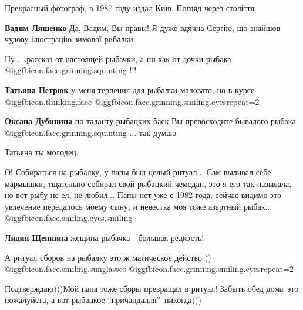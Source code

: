  
 
 
 
 
\zzSecCmt

\begin{itemize} %
Прекрасный фотограф, в 1987 году издал Київ. Погляд через століття

\textbf{Вадим Ляшенко}
Да, Вадим, Вы правы!
Я дуже вдячна Сергію, що знайшов чудову ілюстрацію зимової рибалки.

Ну ....рассказ от настоящей рыбачки, а ни как от дочки рыбака  @igg{fbicon.face.grinning.squinting} !!!

\begin{itemize} %
\textbf{Татьяна Петрюк} у меня терпения для рыбалки маловато, но в курсе @igg{fbicon.thinking.face}  @igg{fbicon.face.grinning.smiling.eyes}{repeat=2} 

\textbf{Оксана Дубинина} по таланту рыбацких баек Вы превосходите бывалого рыбака  @igg{fbicon.face.grinning.squinting} ... так думаю

Татьяна ты молодец.
\end{itemize} %


О! Собираться на рыбалку, у папы был целый ритуал... Сам выливал себе мармышки,
тщательно собирал свой рыбацкий чемодан, это я его так называла, но вот рыбу не
ел, не любил... Папы нет уже с 1982 года, сейчас видимо это увлечение передалось
моему сыну, и невестка моя тоже азартный рыбак.. @igg{fbicon.face.smiling.eyes.smiling} 

\begin{itemize} %
\textbf{Лидия Щепкина} жещина-рыбачка - большая редкость!

А ритуал сборов на рыбалку это ж магическое действо ))
@igg{fbicon.face.smiling.sunglasses}
@igg{fbicon.face.grinning.smiling.eyes}{repeat=2} 

Подтверждаю)))Мой папа тоже сборы превращал в ритуал! Забыть обед дома~это пожалуйста, а вот рыбацкое \enquote{причандалля}~никогда)))
\end{itemize} %


\end{itemize}
